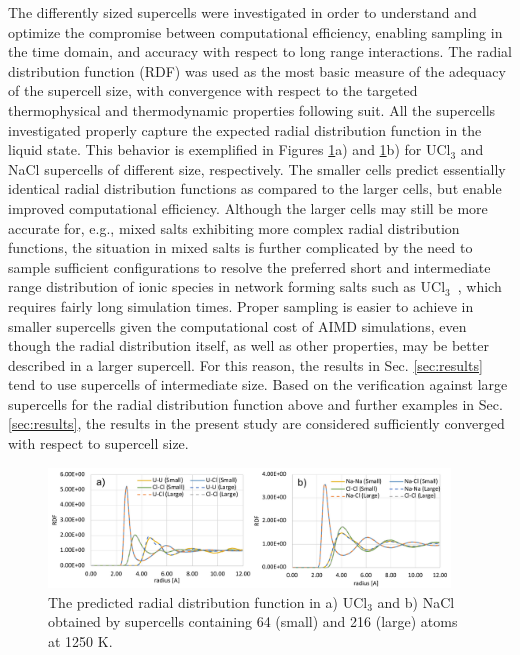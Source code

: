\documentclass[preprint,3p,10pt,onecolumn,number,sort&compress]{elsarticle}
\begin{document}
The differently sized supercells were investigated in order to understand and optimize the compromise between computational efficiency, enabling sampling in the time domain, and accuracy with respect to long range interactions. The radial distribution function (RDF) was used as the most basic measure of the adequacy of the supercell size, with convergence with respect to the targeted thermophysical and thermodynamic properties following suit. All the supercells investigated properly capture the expected radial distribution function in the liquid state. This behavior is exemplified in Figures \ref{fig:radial}a) and \ref{fig:radial}b) for UCl$_3$ and NaCl supercells of different size, respectively. The smaller cells predict essentially identical radial distribution functions as compared to the larger cells, but enable improved computational efficiency. Although the larger cells may still be more accurate for, e.g., mixed salts exhibiting more complex radial distribution functions, the situation in mixed salts is further complicated by the need to sample sufficient configurations to resolve the preferred short and intermediate range distribution of ionic species in network forming salts such as UCl$_3$~\cite{Li}, which requires fairly long simulation times. Proper sampling is easier to achieve in smaller supercells given the computational cost of AIMD simulations, even though the radial distribution itself, as well as other properties, may be better described in a larger supercell. For this reason, the results in Sec. \ref{sec:results} tend to use supercells of intermediate size.  Based on the verification against large supercells for the radial distribution function above and further examples in Sec. \ref{sec:results}, the results in the present study are considered sufficiently converged with respect to supercell size.

\begin{figure}[htb]
\centering
\includegraphics[width=0.95\textwidth]{FIG1_0.pdf}
\caption{The predicted radial distribution function in a) UCl$_3$ and b) NaCl obtained by supercells containing 64 (small) and 216 (large) atoms at 1250 K.} 
\label{fig:radial}
\end{figure}
\end{document}
